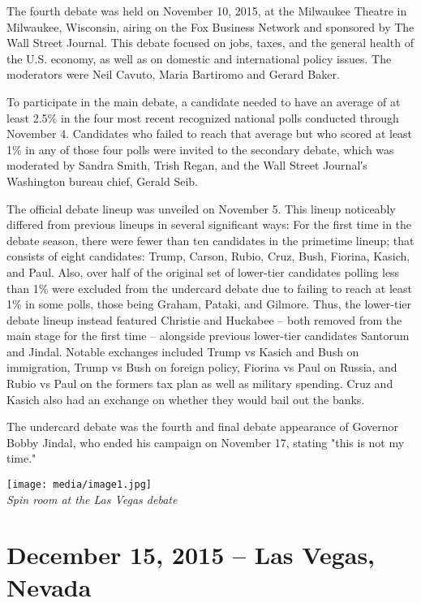 The fourth debate was held on November 10, 2015, at the Milwaukee
Theatre in Milwaukee, Wisconsin, airing on the Fox Business Network and
sponsored by The Wall Street Journal. This debate focused on jobs,
taxes, and the general health of the U.S. economy, as well as on
domestic and international policy issues. The moderators were Neil
Cavuto, Maria Bartiromo and Gerard Baker.

To participate in the main debate, a candidate needed to have an average
of at least 2.5\% in the four most recent recognized national polls
conducted through November 4. Candidates who failed to reach that
average but who scored at least 1\% in any of those four polls were
invited to the secondary debate, which was moderated by Sandra Smith,
Trish Regan, and the Wall Street Journal′s Washington bureau chief,
Gerald Seib.

The official debate lineup was unveiled on November 5. This lineup
noticeably differed from previous lineups in several significant ways:
For the first time in the debate season, there were fewer than ten
candidates in the primetime lineup; that consists of eight candidates:
Trump, Carson, Rubio, Cruz, Bush, Fiorina, Kasich, and Paul. Also, over
half of the original set of lower-tier candidates polling less than 1\%
were excluded from the undercard debate due to failing to reach at least
1\% in some polls, those being Graham, Pataki, and Gilmore. Thus, the
lower-tier debate lineup instead featured Christie and Huckabee -- both
removed from the main stage for the first time -- alongside previous
lower-tier candidates Santorum and Jindal. Notable exchanges included
Trump vs Kasich and Bush on immigration, Trump vs Bush on foreign
policy, Fiorina vs Paul on Russia, and Rubio vs Paul on the formers tax
plan as well as military spending. Cruz and Kasich also had an exchange
on whether they would bail out the banks.

The undercard debate was the fourth and final debate appearance of
Governor Bobby Jindal, who ended his campaign on November 17, stating
"this is not my time."

\texttt{[image: media/image1.jpg]}\\
\emph{Spin room at the Las Vegas debate}

\section{December 15, 2015 -- Las Vegas,
Nevada}\label{december-15-2015-las-vegas-nevada}

